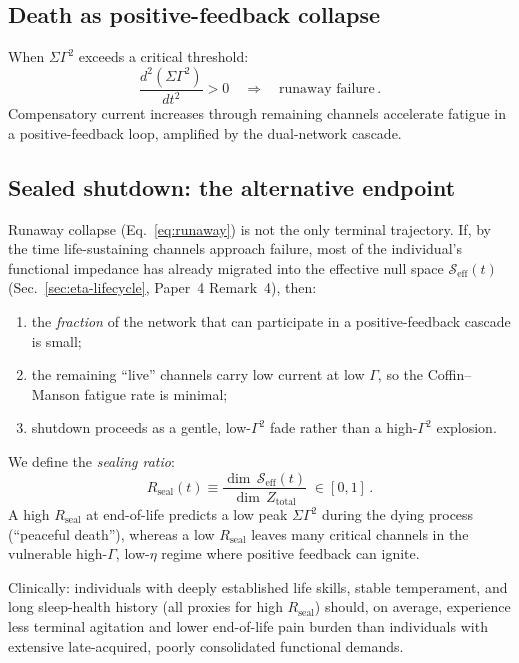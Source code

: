 \documentclass[aps,pre,twocolumn,superscriptaddress,floatfix]{revtex4-2}
\begin{document}
\subsection{Death as positive-feedback collapse}

When $\Sigma\Gamma^2$ exceeds a critical threshold:
\begin{equation}
  \frac{d^2(\Sigma\Gamma^2)}{dt^2} > 0
  \quad\Longrightarrow\quad
  \text{runaway failure}\,.
  \label{eq:runaway}
\end{equation}
Compensatory current increases through remaining channels
accelerate fatigue in a positive-feedback loop,
amplified by the dual-network cascade.

\subsection{Sealed shutdown: the alternative endpoint}
\label{sec:sealed-death}

Runaway collapse (Eq.~\ref{eq:runaway}) is not the only
terminal trajectory.
If, by the time life-sustaining channels approach failure,
most of the individual's functional impedance has already
migrated into the effective null space
$\mathcal{S}_{\text{eff}}(t)$ (Sec.~\ref{sec:eta-lifecycle},
Paper~4 Remark~4), then:
\begin{enumerate}
  \item the \emph{fraction} of the network that can
    participate in a positive-feedback cascade is small;
  \item the remaining ``live'' channels carry low current
    at low $\Gamma$, so the Coffin--Manson fatigue rate
    is minimal;
  \item shutdown proceeds as a gentle, low-$\Gamma^2$
    fade rather than a high-$\Gamma^2$ explosion.
\end{enumerate}
We define the \emph{sealing ratio}:
\begin{equation}
  R_{\text{seal}}(t) \equiv
    \frac{\dim\,\mathcal{S}_{\text{eff}}(t)}
         {\dim\,Z_{\text{total}}}
  \;\in [0,1]\,.
  \label{eq:seal-ratio}
\end{equation}
A high $R_{\text{seal}}$ at end-of-life predicts a low
peak $\Sigma\Gamma^2$ during the dying process
(``peaceful death''), whereas a low $R_{\text{seal}}$
leaves many critical channels in the vulnerable
high-$\Gamma$, low-$\eta$ regime where positive feedback
can ignite.

Clinically: individuals with deeply established life
skills, stable temperament, and long sleep-health history
(all proxies for high $R_{\text{seal}}$) should, on
average, experience less terminal agitation and lower
end-of-life pain burden than individuals with extensive
late-acquired, poorly consolidated functional demands.
\end{document}
